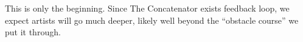 \documentclass{article}
\begin{document}
This is only the beginning. Since The Concatenator exists feedback loop, we expect artists will go much deeper, likely well beyond the ``obstacle course'' we put it through.



%
%
%
%
%
\end{document}
